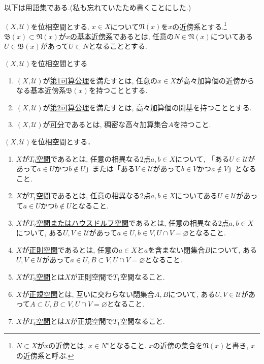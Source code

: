 \documentclass[dvipdfmx,a4paper,11pt]{article}
\theoremstyle{definition}
\begin{document}
\medskip
以下は用語集である.(私も忘れていたため書くことにした.)

 $(X, \mathscr{U})$を位相空間とする. $x\in X$について$\mathfrak{N}(x) $を$x$の近傍系とする.\footnote{$N \subset X$が$x$の近傍とは, $x \in N^{\circ}$となること. $x$の近傍の集合を$\mathfrak{N}(x) $と書き, $x$の近傍系と呼ぶ.} 
$\mathfrak{B}(x) \subset \mathfrak{N}(x) $が\underline{$x$の基本近傍系}であるとは, 任意の$N \in \mathfrak{N}(x)$についてある$U \in \mathfrak{B}(x)$があって$U \subset N$となることとする.
    \begin{tcolorbox}[
    colback = white,
    colframe = green!35!black,
    fonttitle = \bfseries,
    breakable = true]
$(X, \mathscr{U})$を位相空間とする
\begin{enumerate}
\setlength{\parskip}{0cm} 
  \setlength{\itemsep}{4pt} 
\item $(X, \mathscr{U})$が\underline{第1可算公理}を満たすとは, 任意の$x \in X$が高々加算個の近傍からなる基本近傍系$\mathfrak{B}(x)$を持つこととする.
\item $(X, \mathscr{U})$が\underline{第2可算公理}を満たすとは, 高々加算個の開基を持つこととする.
\item $(X, \mathscr{U})$が\underline{可分}であるとは, 稠密な高々加算集合$A$を持つこと.
\end{enumerate}
 \end{tcolorbox}

   \begin{tcolorbox}[
    colback = white,
    colframe = green!35!black,
    fonttitle = \bfseries,
    breakable = true]
$(X, \mathscr{U})$を位相空間とする．

\begin{enumerate}
\setlength{\parskip}{0cm} 
  \setlength{\itemsep}{4pt} 
  \item  $X$が\underline{$T_0$空間}であるとは, 任意の相異なる2点$a, b \in X$について, 「ある$U \in \mathscr{U}$があって$a \in U$かつ$b \not \in U$」または「ある$V \in \mathscr{U}$があって$b \in V$かつ$a\not \in V$」となること.
\item $X$が\underline{$T_1$空間}であるとは, 任意の相異なる2点$a, b \in X$についてある$U \in \mathscr{U}$があって$a \in U$かつ$b \not \in U$となること.
\item $X$が\underline{$T_2$空間またはハウスドルフ空間}であるとは, 任意の相異なる2点$a, b \in X$について, ある$U, V \in \mathscr{U}$があって$a \in U, b \in V, U \cap V = \varnothing $となること.
\item $X$が\underline{正則空間}であるとは, 任意の$a\in X$と$a$を含まない閉集合$B$について, ある$U, V \in \mathscr{U}$があって$a \in U, B \subset V, U \cap V = \varnothing $となること.
\item $X$が\underline{$T_3$空間}とは$X$が正則空間で$T_1$空間なること.
\item $X$が\underline{正規空間}とは, 互いに交わらない閉集合$A,B$について, ある$U, V \in \mathscr{U}$があって$A \subset U, B \subset V, U \cap V = \varnothing $となること.
\item $X$が\underline{$T_4$空間}とは$X$が正規空間で$T_1$空間なること.
\end{enumerate}
 \end{tcolorbox}
 
\end{document}

